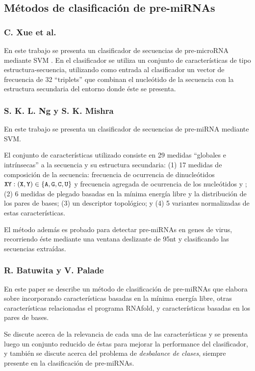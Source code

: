 \documentclass[12pt,bibliography=oldstyle,DIV=12,parskip=half-]{scrartcl}
\begin{document}
\subsection{Métodos de clasificación de pre-miRNAs}
\subsubsection*{C. Xue et al. \cite{xue}}
%
En este trabajo se presenta un clasificador de secuencias de
pre-microRNA mediante SVM \cite{svm}.  En el clasificador se utiliza
un conjunto de características de tipo estructura-secuencia,
utilizando como entrada al clasificador un vector de frecuencia de 32
``triplets'' que combinan el nucleótido de la secuencia con la
estructura secundaria del entorno donde éste se presenta.
%
\subsubsection*{S. K. L. Ng y S. K. Mishra \cite{ng}}
%
En este trabajo se presenta un clasificador de secuencias de
pre-miRNA mediante SVM.

El conjunto de características utilizado consiste en 29 medidas
``globales e intrínsecas'' a la secuencia y su estructura secundaria:
(1) 17 medidas de composición de la secuencia: frecuencia de
ocurrencia de dinucleótidos
${\tt XY}:({\tt X},{\tt Y})\in\{{\tt A},{\tt G},{\tt C},{\tt U}\}$
y frecuencia agregada de ocurrencia de los nucleótidos  y
; (2) 6 medidas de plegado basadas en la mínima energía libre
y la distribución de los pares de bases; (3) un descriptor
topológico; y (4) 5 variantes normalizadas de estas características.

El método además es probado para detectar pre-miRNAs en genes de
virus, recorriendo éste mediante una ventana deslizante de 95nt y
clasificando las secuencias extraídas.
%
\subsubsection*{R. Batuwita y V. Palade \cite{batuwita}}
En este paper se describe un método de clasificación de pre-miRNAs que
elabora sobre \cite{ng} incorporando características basadas en la
mínima energía libre, otras características relacionadas el programa
RNAfold, y características basadas en los pares de bases.

Se discute acerca de la relevancia de cada una de las características
y se presenta luego un conjunto reducido de éstas para mejorar la
performance del clasificador, y también se discute acerca del problema
de \emph{desbalance de clases}, siempre presente en la
clasificación de pre-miRNAs.
%
\end{document}
